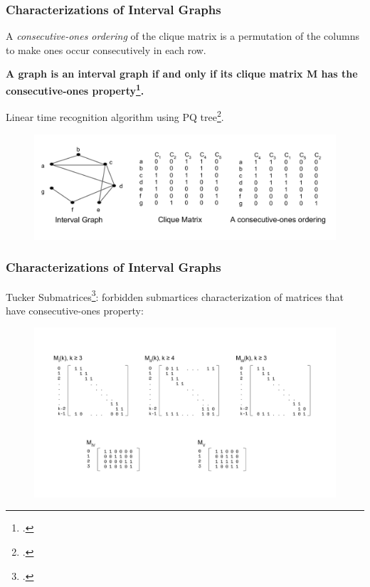 \documentclass{beamer}
\begin{document}
\begin{frame}
	\frametitle{Characterizations of Interval Graphs}
	A \emph{consecutive-ones ordering} of the clique matrix is a permutation of the columns to make ones occur consecutively in each row.
    
    \vspace{0.1in}
    
    \textbf{A graph is an interval graph if and only if its clique matrix M has the consecutive-ones property\footcite{fulkerson1965incidence}.}
    
    \vspace{0.1in}
    
    Linear time recognition algorithm using PQ tree\footcite{booth1976testing}.
	\begin{figure}
		\includegraphics[width = 1\textwidth]{figures/cons_ones2.pdf}
	\end{figure}
    	
\end{frame}

%
\begin{frame}
	\frametitle{Characterizations of Interval Graphs}
	Tucker Submatrices\footcite{tucker1972structure}: forbidden submartices characterization of matrices that have consecutive-ones property:
	\begin{figure}
		\includegraphics[width = 1\textwidth]{figures/tucker_matrix.pdf}
	\end{figure}
\end{frame}
\end{document}
